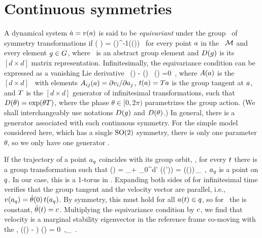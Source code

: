 \section{Continuous symmetries}
\label{s:symm}

A dynamical system $\dot{a}={v}(a)$ is said to be
\emph{equivariant} under the group \Group\ of symmetry transformations if
\beq
   \vel( \ssp )
    =  \matrixRep(\LieEl)^{-1}\vel(\matrixRep(\LieEl)\ssp)
   \,
for every point $a$ in the \statesp\ ${\cal M}$ and every element $g \in
G$, where \LieEl\ is an abstract group element and
${D}(g)$ is its $[d\!\times\!d]$ matrix representation.
Infinitesimally, the equivariance condition  can be expressed as
a vanishing Lie derivative
\beq
  \Lg \, \vel(\ssp)  - \Mvar(\ssp) \, \groupTan(\ssp) =0
  \,,
where
${A}(a)$ is the $[d\!\times\!d]$ \stabmat\, with elements
${A}_{ij}(a)={\partial {v}_i}/{\partial a_j}$, $ t(a)
= {T} a $ is the group tangent at $a$, and ${T}$ is the
$[d\!\times\!d]$ generator of infinitesimal transformations, such that
${D}(\theta) = \exp(\theta{T})$, where the phase $\theta \in [0,2\pi)$
parametrizes the group action. (We shall interchangeably use notations
${D}(g)$ and ${D}(\theta)$.) In general, there is a
generator associated with each continuous symmetry. For the simple model
considered here, which has a single $\textrm{SO}(2)$ symmetry, there is only one
parameter $\theta$, so we only have one generator \Lg.

If the trajectory of a point $a_q$ coincides with its group
orbit, \ie, for every $t$ there is a group transformation such that
\beq
\ssp (\zeit)
    = \ssp_\stagn + \int_0^\zeit \!\!d\zeit' \vel(\ssp (\zeit'))
    = \matrixRep(\theta (\zeit))\,\ssp_\stagn
  \,,
$a_q$ is a point on \emph{\reqv} $q$. In our case, this is a
1-torus in \statesp. Expanding both sides of  for infinitesimal time
verifies that the group tangent and the velocity vector are parallel, i.e.,
 ${v}(a_q) = \dot{\theta}(0) \, t(a_q)$.
By symmetry, this must hold for all $a(t) \in q$, so for \reqva\
the \emph{\phaseVel} is constant, $\dot{\theta}(t) = c$.
Multiplying the equivariance condition \refeq{inftmInv} by $c$, we
find that velocity is a marginal stability eigenvector in the reference frame co-moving
with the \reqv,
\beq
(\Mvar (\ssp) - \velRel \Lg) \vel (\ssp) = 0
\,,\qquad \ssp \in \pS_\stagn
\,.

